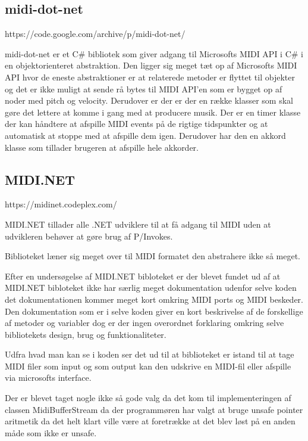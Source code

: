 \subsection{midi-dot-net}

https://code.google.com/archive/p/midi-dot-net/

midi-dot-net er et C\# bibliotek som giver adgang til Microsofts MIDI API i C\# i en objektorienteret abstraktion. 
Den ligger sig meget tæt op af Microsofts MIDI API hvor de eneste abstraktioner er at relaterede metoder er flyttet til objekter og det er ikke muligt at sende rå bytes til MIDI API’en som er bygget op af noder med pitch og velocity. 
Derudover er der er der en række klasser som skal gøre det lettere at komme i gang med at producere musik. Der er en timer klasse der kan håndtere at afspille MIDI events på de rigtige tidspunkter og at automatisk at stoppe med at afspille dem igen. Derudover har den en akkord klasse som tillader brugeren at afspille hele akkorder.

\subsection{MIDI.NET}

https://midinet.codeplex.com/ 

MIDI.NET tillader alle .NET udviklere til at få adgang til MIDI uden at udvikleren behøver at gøre brug af P/Invokes.

Biblioteket læner sig meget over til MIDI formatet den abstrahere ikke så meget.

Efter en undersøgelse af MIDI.NET bibloteket er der blevet fundet ud af at MIDI.NET bibloteket ikke har særlig meget dokumentation udenfor selve koden det dokumentationen kommer meget kort omkring MIDI ports og MIDI beskeder. 
Den dokumentation som er i selve koden giver en kort beskrivelse af de forskellige af metoder og variabler dog er der ingen overordnet forklaring omkring selve bibliotekets design, brug og funktionaliteter.

Udfra hvad man kan se i koden ser det ud til at biblioteket er istand til at tage MIDI filer som input og som output kan den udskrive en MIDI-fil eller afspille via microsofts interface.

Der er blevet taget nogle ikke så gode valg da det kom til implementeringen af classen MidiBufferStream da der programmøren har valgt at bruge unsafe pointer aritmetik da det helt klart ville være at foretrække at det blev løst på en anden måde som ikke er unsafe.  
